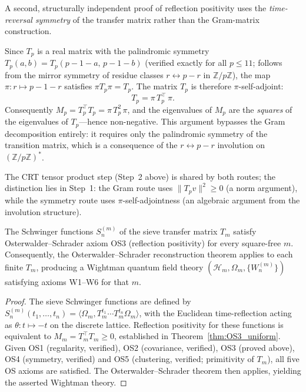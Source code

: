 \documentclass[12pt,a4paper]{article}
\begin{document}
\begin{remark}
\label{rem:OS3_symmetry}
A second, structurally independent proof of reflection positivity
uses the \emph{time-reversal symmetry} of the transfer matrix rather
than the Gram-matrix construction.

Since $T_p$ is a real matrix with the palindromic symmetry
$T_p(a,b) = T_p(p{-}1{-}a,\, p{-}1{-}b)$ (verified exactly for all
$p \leq 11$; follows from the mirror symmetry of residue classes
$r \leftrightarrow p - r$ in $\mathbb{Z}/p\mathbb{Z}$), the map
$\pi: r \mapsto p - 1 - r$ satisfies $\pi T_p \pi = T_p$.
The matrix $T_p$ is therefore $\pi$-self-adjoint:
\[
  T_p = \pi\, T_p^{\!\top}\, \pi.
\]
Consequently $M_p = T_p^{\!\top} T_p = \pi\, T_p^2\, \pi$, and the
eigenvalues of $M_p$ are the \emph{squares} of the eigenvalues of
$T_p$---hence non-negative.  This argument bypasses the Gram
decomposition entirely: it requires only the palindromic symmetry of
the transition matrix, which is a consequence of the $r \leftrightarrow p-r$
involution on $(\mathbb{Z}/p\mathbb{Z})^*$.

The CRT tensor product step (Step~2 above) is shared by both routes;
the distinction lies in Step~1: the Gram route uses $\|T_p v\|^2 \geq 0$
(a norm argument), while the symmetry route uses $\pi$-self-adjointness
(an algebraic argument from the involution structure).
\end{remark}

\begin{corollary}
\label{cor:OS3_reconstruction}
\mBR
The Schwinger functions $S_n^{(m)}$ of the sieve transfer matrix
$T_m$ satisfy Osterwalder--Schrader axiom OS3 (reflection positivity)
for every square-free $m$.  Consequently, the
Osterwalder--Schrader reconstruction theorem
\cite{OsterwalderSchrader1973,OsterwalderSchrader1975}
applies to each finite $T_m$, producing a Wightman quantum field
theory $(\mathcal{H}_m, \Omega_m, \{W_n^{(m)}\})$ satisfying axioms
W1--W6 for that $m$.
\end{corollary}

\begin{proof}
The sieve Schwinger functions are defined by
$S_n^{(m)}(t_1,\ldots,t_n) = \langle \Omega_m, T_m^{t_1} \cdots
T_m^{t_n} \Omega_m \rangle$, with the Euclidean time-reflection acting
as $\theta\colon t \mapsto -t$ on the discrete lattice.
Reflection positivity for these functions is equivalent to
$M_m = T_m^{\!\top} T_m \geq 0$,
established in Theorem~\ref{thm:OS3_uniform}.
Given OS1 (regularity, verified), OS2 (covariance, verified),
OS3 (proved above), OS4 (symmetry, verified) and OS5 (clustering,
verified; primitivity of $T_m$), all five OS axioms are satisfied.
The Osterwalder--Schrader theorem then applies, yielding the asserted
Wightman theory.
\end{proof}
\end{document}
